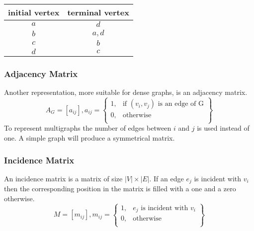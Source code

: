 \documentclass[a4paper, 10pt]{article}
\begin{document}
\begin{multicols}{2}
    \begin{center}
    \end{center}
    \begin{tabular}{| c | c |}
        \hline
        initial vertex & terminal vertex \\
        \hline
        \(a\)          & \(d\) \\
        \(b\)          & \(a,d\) \\
        \(c\)          & \(b\) \\
        \(d\)          & \(c\) \\
        \hline
    \end{tabular}
\end{multicols}
\subsubsection{Adjacency Matrix}
Another representation, more suitable for dense graphs, is an adjacency matrix.
\[ A_G=[a_{ij}], a_{ij}=\left\{\begin{array}{lr}
    1, & \text{if } (v_i, v_j) \text{ is an edge of G} \\
    0, & \text{otherwise} \\
\end{array}\right\} \]
To represent multigraphs the number of edges between \(i\) and \(j\) is used instead of one. A simple graph will produce a symmetrical matrix.

\subsubsection{Incidence Matrix}
An incidence matrix is a matrix of size \(|V|\times |E|\). If an edge \(e_j\) is incident with \(v_i\) then the corresponding position in the matrix is filled with a one and a zero otherwise.
\[ M=[m_{ij}], m_{ij}=\left\{\begin{array}{lr}
    1, & e_j \text{ is incident with } v_i \\
    0, & \text{otherwise} \\
\end{array}\right\} \]
\end{document}
